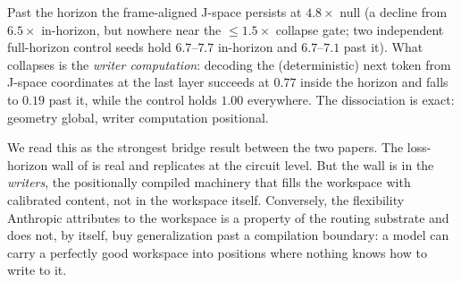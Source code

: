 \documentclass[11pt]{article}
\newcommand{\Jspace}{J\mbox{-}space}
\begin{document}
Past the horizon the frame-aligned \Jspace{} persists at $4.8\times$ null
(a decline from $6.5\times$ in-horizon, but nowhere near the
${\le}1.5\times$ collapse gate; two independent full-horizon control
seeds hold $6.7$--$7.7$ in-horizon and $6.7$--$7.1$ past it). What collapses is the
\emph{writer computation}: decoding the (deterministic) next token from
\Jspace{} coordinates at the last layer succeeds at $0.77$ inside the
horizon and falls to $0.19$ past it, while the control holds $1.00$
everywhere. The dissociation is exact: geometry global, writer computation
positional.

We read this as the strongest bridge result between the two papers. The
loss-horizon wall of \citet{misra2026nature} is real and replicates at
the circuit level. But the wall is in the \emph{writers}, the
positionally compiled machinery that fills the workspace with calibrated
content, not in the workspace itself. Conversely, the flexibility
Anthropic attributes to the workspace is a property of the routing
substrate and does not, by itself, buy generalization past a compilation
boundary: a model can carry a perfectly good workspace into positions
where nothing knows how to write to it.
\end{document}
